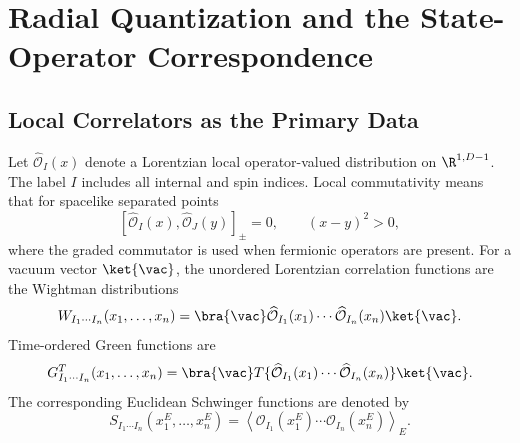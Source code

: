 \chapter{Radial Quantization and the State-Operator Correspondence}
\label{ch:volume-iii-radial-quantization}
\ConventionsMixedCFT


\section{Local Correlators as the Primary Data}

Let \(\widehat{\mathcal O}_I(x)\) denote a Lorentzian local operator-valued
distribution on \(\R^{1,D-1}\).  The label \(I\) includes all internal and
spin indices.  Local commutativity means that for spacelike separated points
\[
  [\widehat{\mathcal O}_I(x),\widehat{\mathcal O}_J(y)]_\pm=0,
  \qquad
  (x-y)^2>0,
\]
where the graded commutator is used when fermionic operators are present.
For a vacuum vector \(\ket{\vac}\), the unordered Lorentzian correlation
functions are the Wightman distributions
\[
  W_{I_1\cdots I_n}(x_1,\ldots,x_n)
  =
  \bra{\vac}
  \widehat{\mathcal O}_{I_1}(x_1)\cdots
  \widehat{\mathcal O}_{I_n}(x_n)
  \ket{\vac}.
\]
Time-ordered Green functions are
\[
  G^T_{I_1\cdots I_n}(x_1,\ldots,x_n)
  =
  \bra{\vac}
  T\{\widehat{\mathcal O}_{I_1}(x_1)\cdots
  \widehat{\mathcal O}_{I_n}(x_n)\}
  \ket{\vac}.
\]
The corresponding Euclidean Schwinger functions are denoted by
\[
  S_{I_1\cdots I_n}(x^E_1,\ldots,x^E_n)
  =
  \left\langle
  \mathcal O_{I_1}(x^E_1)\cdots\mathcal O_{I_n}(x^E_n)
  \right\rangle_E .
\]
